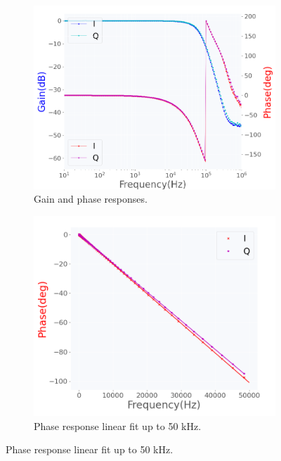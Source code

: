\documentclass[12pt]{article}
\begin{document}
\begin{figure}[H]
    \centering
    \begin{subfigure}{0.52\textwidth}
    \includegraphics[width=\textwidth]{besselbest.png}
    \caption{Gain and phase responses.}
    \end{subfigure}
    \begin{subfigure}{0.47\textwidth}
     \includegraphics[width=\textwidth]{fitbessel.png}
           \caption{Phase response linear fit up to 50 kHz.}
    \end{subfigure}
    \end{figure}
\end{document}

